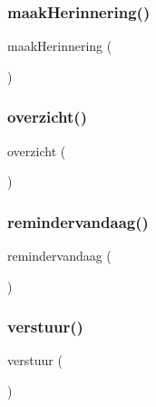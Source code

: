 \mbox{\label{class_mail_a6c70daaf35d6c8f7ff2531c57b5e8cbb}} 
\subsubsection{\texorpdfstring{maak\+Herinnering()}{maakHerinnering()}}
{\footnotesize\ttfamily maak\+Herinnering (\begin{DoxyParamCaption}{ }\end{DoxyParamCaption})}

\mbox{\label{class_mail_aedd51c36c569faeb3c151027eb79e67d}} 
\subsubsection{\texorpdfstring{overzicht()}{overzicht()}}
{\footnotesize\ttfamily overzicht (\begin{DoxyParamCaption}{ }\end{DoxyParamCaption})}

\mbox{\label{class_mail_ad32500041b0b1aca5cb9857134aef2fa}} 
\subsubsection{\texorpdfstring{remindervandaag()}{remindervandaag()}}
{\footnotesize\ttfamily remindervandaag (\begin{DoxyParamCaption}{ }\end{DoxyParamCaption})}

\mbox{\label{class_mail_abc7aefe96831182f37ef67ef34e62527}} 
\subsubsection{\texorpdfstring{verstuur()}{verstuur()}}
{\footnotesize\ttfamily verstuur (\begin{DoxyParamCaption}{ }\end{DoxyParamCaption})}

